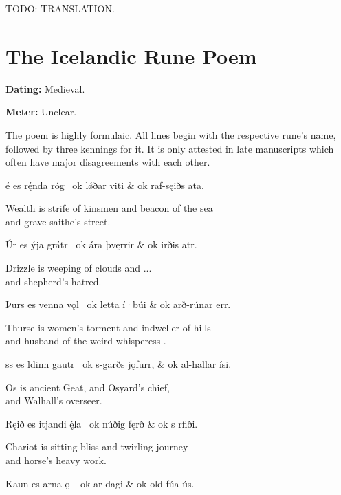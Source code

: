 \bvb TODO: TRANSLATION.\evb\evg

\sectionline

\section{The Icelandic Rune Poem}\chapterStart{}

\begin{flushright}%
\textbf{Dating:} Medieval.%

\textbf{Meter:} Unclear.
\end{flushright}%

The poem is highly formulaic.  All lines begin with the respective rune’s name, followed by three kennings for it.  It is only attested in late manuscripts which often have major disagreements with each other.

\sectionline

\bvg\bva {}é es rę́nda róg \hld\ ok lǿðar viti &
\ind ok raf-sęiðs ata.\eva

\bvb Wealth is strife of kinsmen and beacon of the sea \\
and grave-saithe’s  street.\evb\evg


\bvg\bva Úr es ýja grátr \hld\ ok ára þvęrrir &
\ind ok irðis atr.\eva

\bvb Drizzle is weeping of clouds and ... \\
and shepherd’s hatred.\evb\evg


\bvg\bva Þurs es venna vǫl \hld\ ok letta í·búi &
\ind ok arð-rúnar err.\eva

\bvb Thurse is women’s torment and indweller of hills \\
and husband of the weird-whisperess .\evb\evg


\bvg\bva {}ss es ldinn gautr \hld\ ok s-garðs jǫfurr, &
\ind ok al-hallar ísi.\eva

\bvb Os is ancient Geat, and Osyard’s chief, \\
and Walhall’s overseer.\evb\evg


\bvg\bva Ręið es itjandi ę́la \hld\ ok núðig fęrð &
\ind ok s rfiði.\eva

\bvb Chariot is sitting bliss and twirling journey \\
and horse’s heavy work.\evb\evg


\bvg\bva Kaun es arna ǫl \hld\ ok ar-dagi &
\ind ok old-fúa ús.\eva

